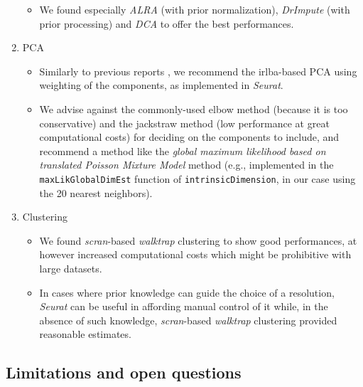 \documentclass{bmcart}
\begin{document}
\begin{enumerate}
\begin{itemize}
       \item We found especially \textit{ALRA} (with prior normalization), \textit{DrImpute} (with prior processing) and \textit{DCA} to offer the best performances.
   \end{itemize}
   \item PCA
   \begin{itemize}
     \item Similarly to previous reports \cite{SunDimRed2019}, we recommend the irlba-based PCA using weighting of the components, as implemented in \textit{Seurat}. 
     \item We advise against the commonly-used elbow method (because it is too conservative) and the jackstraw method (low performance at great computational costs) for deciding on the components to include, and recommend a method like the \textit{global maximum likelihood based on translated Poisson Mixture Model} method (e.g., implemented in the  \texttt{maxLikGlobalDimEst} function of \texttt{intrinsicDimension}, in our case using the 20 nearest neighbors).
   \end{itemize}
   \item Clustering
   \begin{itemize}
    \item We found \textit{scran}-based \textit{walktrap} clustering to show good performances, at however increased computational costs which might be prohibitive with large datasets.
    \item In cases where prior knowledge can guide the choice of a resolution, \textit{Seurat} can be useful in affording manual control of it while, in the absence of such knowledge, \textit{scran}-based \textit{walktrap} clustering provided reasonable estimates.
   \end{itemize}
\end{enumerate}

\subsection*{Limitations and open questions}
\end{document}

